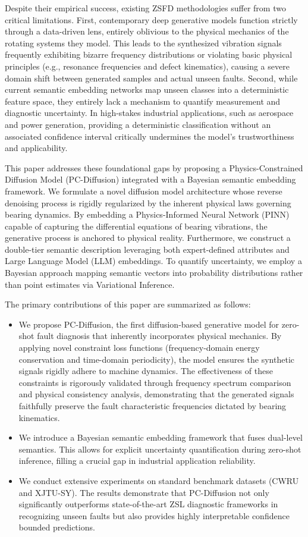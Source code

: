 \documentclass[journal]{IEEEtran}
\begin{document}
Despite their empirical success, existing ZSFD methodologies suffer from two critical limitations. First, contemporary deep generative models function strictly through a data-driven lens, entirely oblivious to the physical mechanics of the rotating systems they model. This leads to the synthesized vibration signals frequently exhibiting bizarre frequency distributions or violating basic physical principles (e.g., resonance frequencies and defect kinematics), causing a severe domain shift between generated samples and actual unseen faults. Second, while current semantic embedding networks \cite{schonfeld2019cada} map unseen classes into a deterministic feature space, they entirely lack a mechanism to quantify measurement and diagnostic uncertainty. In high-stakes industrial applications, such as aerospace and power generation, providing a deterministic classification without an associated confidence interval critically undermines the model's trustworthiness and applicability.

This paper addresses these foundational gaps by proposing a Physics-Constrained Diffusion Model (PC-Diffusion) integrated with a Bayesian semantic embedding framework. We formulate a novel diffusion model architecture whose reverse denoising process is rigidly regularized by the inherent physical laws governing bearing dynamics. By embedding a Physics-Informed Neural Network (PINN) capable of capturing the differential equations of bearing vibrations, the generative process is anchored to physical reality. Furthermore, we construct a double-tier semantic description leveraging both expert-defined attributes and Large Language Model (LLM) embeddings. To quantify uncertainty, we employ a Bayesian approach mapping semantic vectors into probability distributions rather than point estimates via Variational Inference. 

The primary contributions of this paper are summarized as follows:
\begin{itemize}
    \item We propose PC-Diffusion, the first diffusion-based generative model for zero-shot fault diagnosis that inherently incorporates physical mechanics. By applying novel constraint loss functions (frequency-domain energy conservation and time-domain periodicity), the model ensures the synthetic signals rigidly adhere to machine dynamics. The effectiveness of these constraints is rigorously validated through frequency spectrum comparison and physical consistency analysis, demonstrating that the generated signals faithfully preserve the fault characteristic frequencies dictated by bearing kinematics.
    \item We introduce a Bayesian semantic embedding framework that fuses dual-level semantics. This allows for explicit uncertainty quantification during zero-shot inference, filling a crucial gap in industrial application reliability.
    \item We conduct extensive experiments on standard benchmark datasets (CWRU and XJTU-SY). The results demonstrate that PC-Diffusion not only significantly outperforms state-of-the-art ZSL diagnostic frameworks in recognizing unseen faults but also provides highly interpretable confidence bounded predictions.
\end{itemize}
\end{document}
